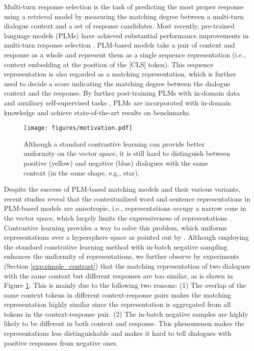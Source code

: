 \documentclass[letterpaper]{article} \usepackage{aaai22}  \usepackage{times}  \usepackage{helvet}  \usepackage{courier}  \usepackage[hyphens]{url}  \usepackage{graphicx} \urlstyle{rm} \def\UrlFont{\rm}  \usepackage{natbib}  \usepackage{caption} \DeclareCaptionStyle{ruled}{labelfont=normalfont,labelsep=colon,strut=off} \frenchspacing  \setlength{\pdfpagewidth}{8.5in}  \setlength{\pdfpageheight}{11in}  \usepackage{algorithm}
\begin{document}
Multi-turn response selection is the task of predicting the most proper response using a retrieval model by measuring the matching degree between a multi-turn dialogue context and a set of response candidates. 
Most recently, pre-trained language models (PLMs) have achieved substantial performance improvements in multi-turn response selection \cite{lu2020improving,gu2020speaker,humeau2019poly}. PLM-based models take a pair of context and response as a whole and represent them as a single sequence representation (i.e., context embedding at the position of the [CLS] token). This sequence representation is also regarded as a matching representation, which is further used to decide a score indicating the matching degree between the dialogue context and the response. By further post-training PLMs with in-domain data and auxiliary self-supervised tasks \cite{whang2020domain,whang2020response,xu2020learning}, PLMs are incorporated with in-domain knowledge and achieve state-of-the-art results on benchmarks.

\begin{figure}[htbp]
    \centering
    \texttt{[image: figures/motivation.pdf]}
    \caption{Although a standard contrastive learning can provide better uniformity on the vector space, it is still hard to distinguish between positive (yellow) and negative (blue) dialogues with the same context (in the same shape, e.g., star).}
    \label{fig:contras}
\end{figure}



Despite the success of PLM-based matching models and their various variants, recent studies reveal that the contextualized word and sentence representations in PLM-based models are anisotropic, i.e., representations occupy a narrow cone in the vector space, which largely limits the expressiveness of representations \cite{ethayarajh-2019-contextual,li-etal-2020-sentence}. Contrastive learning provides a way to solve this problem, which uniforms representations over a hypersphere space as pointed out by \citet{wang2020understanding}. Although employing the standard constrative learning method \cite{chen2020simple,fang2020cert} with in-batch negative sampling enhances the uniformity of representations, we further observe by experiments (Section \ref{exp:simple_contrast}) that the matching representation of two dialogues with the same context but different responses are too similar, as is shown in Figure \ref{fig:contras}. This is mainly due to the following two reasons: (1) The overlap of the same context tokens in different context-response pairs makes the matching representation highly similar since the representation is aggregated from all tokens in the context-response pair. (2) The in-batch negative samples are highly likely to be different in both context and response. This phenomenon makes the representations less distinguishable and makes it hard to tell dialogues with positive responses from negative ones.
\end{document}

